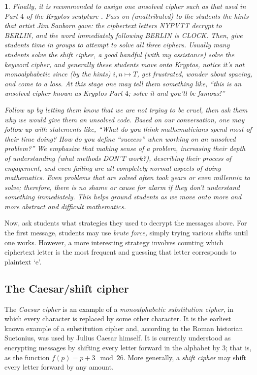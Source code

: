 \documentclass[11pt]{article}
\theoremstyle{plain}
\theoremstyle{remark}
\theoremstyle{definition}
\theoremstyle{definition}
\theoremstyle{definition}
\theoremstyle{plain}
\theoremstyle{plain}
\theoremstyle{plain}
\newtheorem{act}[thm]{\protect\activityname}
\theoremstyle{definition}
\providecommand{\activityname}{Activity}
\begin{document}
\begin{act}
Finally, it is recommended to assign one unsolved cipher such as that used in
Part $4$ of the Kryptos sculpture \cite{bauerJamesSanbornKryptos2016}.
Pass on (unattributed) to the students the hints that artist Jim Sanborn
gave: the ciphertext letters NYPVTT decrypt to BERLIN, and the word
immediately following BERLIN is CLOCK. Then, give students time in
groups to attempt to solve all three ciphers. Usually many students
solve the shift cipher, a good handful (with my assistance) solve
the keyword cipher, and generally these students move onto Kryptos,
notice it's not monoalphabetic since (by the hints) $i,n\mapsto T$,
get frustrated, wonder about spacing, and come to a loss. At this
stage one may tell them something like, ``this is an unsolved cipher known
as Kryptos Part $4$; solve it and you'll be famous!''

Follow up by letting them know that we are not trying to be cruel,
then ask them why we would give them an unsolved code. Based on our
conversation, one may follow up with statements like, ``What do you
think mathematicians spend most of their time doing? How do you define
``success'' when working on an unsolved problem?'' We emphasize that
making sense of a problem, increasing their depth of understanding
(what methods DON'T work?), describing their process of engagement,
and even failing are all completely normal aspects of doing mathematics.
Even problems that are solved often took years or even
millennia to solve; therefore, there is no shame or cause for alarm
if they don't understand something immediately. This helps
ground students as we move onto more and more abstract and difficult
mathematics.

\end{act}

Now, ask students what strategies they used to decrypt the messages
above. For the first message, students may use \textit{brute force,
}simply trying various shifts until one works. However, a more interesting
strategy involves counting which ciphertext letter is the most frequent
and guessing that letter corresponds to plaintext `e'. 

\subsection{The Caesar/shift cipher}

The \textit{Caesar cipher} is an example of a \textit{monoalphabetic
substitution cipher}, in which every character is replaced by some
other character. It is the earliest known example of a substitution
cipher and, according to the Roman historian Suetonius, was used by
Julius Caesar himself. It is currently understood as encrypting messages
by shifting every letter forward in the alphabet by $3$; that is,
as the function $f(p)=p+3\mod26$. More generally, a \textit{shift cipher} may shift every letter forward by any amount.
\end{document}
